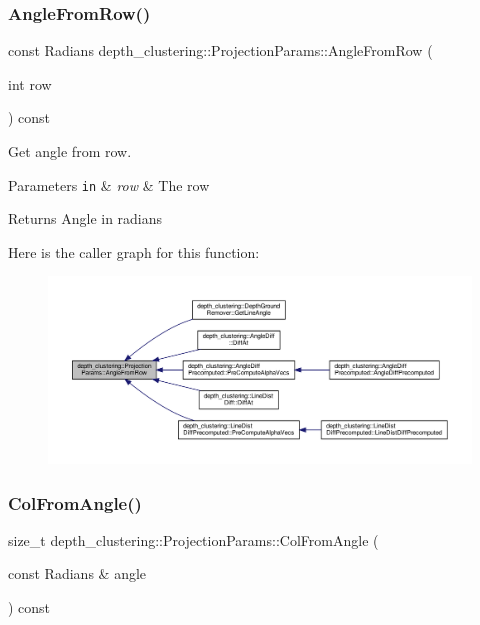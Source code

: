 \subsubsection{\texorpdfstring{Angle\+From\+Row()}{AngleFromRow()}}
{\footnotesize\ttfamily const Radians depth\+\_\+clustering\+::\+Projection\+Params\+::\+Angle\+From\+Row (\begin{DoxyParamCaption}\item[{int}]{row }\end{DoxyParamCaption}) const}



Get angle from row. 


\begin{DoxyParams}[1]{Parameters}
\mbox{\tt in}  & {\em row} & The row\\
\hline
\end{DoxyParams}
\begin{DoxyReturn}{Returns}
Angle in radians 
\end{DoxyReturn}
Here is the caller graph for this function\+:\nopagebreak
\begin{figure}[H]
\begin{center}
\leavevmode
\includegraphics[width=350pt]{classdepth__clustering_1_1ProjectionParams_adc48aa54d8c0c1da8167ab4001a83131_icgraph}
\end{center}
\end{figure}
\mbox{\label{classdepth__clustering_1_1ProjectionParams_a76d3be24f6c166bc5567d622e4a4995b}} 
\subsubsection{\texorpdfstring{Col\+From\+Angle()}{ColFromAngle()}}
{\footnotesize\ttfamily size\+\_\+t depth\+\_\+clustering\+::\+Projection\+Params\+::\+Col\+From\+Angle (\begin{DoxyParamCaption}\item[{const Radians \&}]{angle }\end{DoxyParamCaption}) const}



